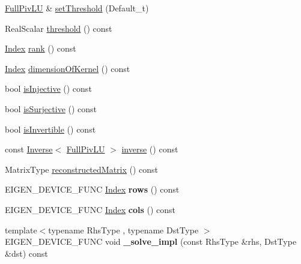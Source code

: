 \begin{DoxyCompactItemize}
\hyperlink{group___l_u___module_class_eigen_1_1_full_piv_l_u}{Full\+Piv\+LU} \& \hyperlink{group___l_u___module_a1b5e30add3dfb6625da1213d68418f44}{set\+Threshold} (Default\+\_\+t)
\item 
Real\+Scalar \hyperlink{group___l_u___module_ad77539203694f2d85ff7d11616e5a0a5}{threshold} () const
\item 
\hyperlink{group___core___module_a554f30542cc2316add4b1ea0a492ff02}{Index} \hyperlink{group___l_u___module_a67a870aa69e699e058d04802ba0bdad9}{rank} () const
\item 
\hyperlink{group___core___module_a554f30542cc2316add4b1ea0a492ff02}{Index} \hyperlink{group___l_u___module_a64e191225834e91161ea53ad4b78167b}{dimension\+Of\+Kernel} () const
\item 
bool \hyperlink{group___l_u___module_ab13992c852aa593461d9b81790b56667}{is\+Injective} () const
\item 
bool \hyperlink{group___l_u___module_a1f6222875fc3a181ee1544b9b36dfda5}{is\+Surjective} () const
\item 
bool \hyperlink{group___l_u___module_afdf2579c93473650f2ef2a47a376c4a0}{is\+Invertible} () const
\item 
const \hyperlink{class_eigen_1_1_inverse}{Inverse}$<$ \hyperlink{group___l_u___module_class_eigen_1_1_full_piv_l_u}{Full\+Piv\+LU} $>$ \hyperlink{group___l_u___module_ae6f4bb55f859f6353f99cf15ecff4b25}{inverse} () const
\item 
Matrix\+Type \hyperlink{group___l_u___module_a191a4f598b0c192a83ab48984e87ee51}{reconstructed\+Matrix} () const
\item 
\mbox{\label{group___l_u___module_a3e6a55cd997c2a16fa6cd81be321c916}} 
E\+I\+G\+E\+N\+\_\+\+D\+E\+V\+I\+C\+E\+\_\+\+F\+U\+NC \hyperlink{group___core___module_a554f30542cc2316add4b1ea0a492ff02}{Index} {\bfseries rows} () const
\item 
\mbox{\label{group___l_u___module_ab775ce41ec3e916ad86868f413c20e85}} 
E\+I\+G\+E\+N\+\_\+\+D\+E\+V\+I\+C\+E\+\_\+\+F\+U\+NC \hyperlink{group___core___module_a554f30542cc2316add4b1ea0a492ff02}{Index} {\bfseries cols} () const
\item 
\mbox{\label{group___l_u___module_aae839fc52d4c930e6d18c973d9f708cd}} 
{\footnotesize template$<$typename Rhs\+Type , typename Dst\+Type $>$ }\\E\+I\+G\+E\+N\+\_\+\+D\+E\+V\+I\+C\+E\+\_\+\+F\+U\+NC void {\bfseries \+\_\+solve\+\_\+impl} (const Rhs\+Type \&rhs, Dst\+Type \&dst) const

\end{DoxyCompactItemize}

